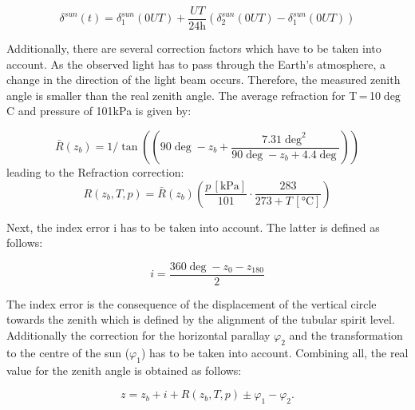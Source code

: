 \begin{equation}
    \delta^{sun}(t) = \delta^{sun}_1(0UT) + \frac{UT}{\text{24h}}(\delta^{sun}_2(0UT)-\delta^{sun}_1(0UT))
\end{equation}

Additionally, there are several correction factors which have to be taken into account. As the observed light has to pass through the Earth's atmosphere, a change in the direction of the light beam occurs. Therefore, the measured zenith angle is smaller than the real zenith angle. The average refraction for T\,=\,10$\deg$C and pressure of 101kPa is given by:

\begin{equation}
    \bar{R}(z_b) = 1/\tan((90 \deg - z_b + \frac{7.31 \deg^2}{90\deg - z_b + 4.4 \deg}))
\end{equation}
 leading to the Refraction correction: 
\begin{equation}
    R(z_b, T, p) = \bar{R}(z_b) \left( \frac{p\, [\si{\kPa}]}{101} \cdot \frac{283}{273 + T\, [\si{\celsius}]} \right)
\end{equation}

Next, the index error i has to be taken into account. The latter is defined as follows:

\begin{equation}
    i = \frac{360 \deg - z_0 - z_{180}}{2}
\end{equation}

The index error is the consequence of the displacement of the
vertical circle towards the zenith which is defined by the alignment of
the tubular spirit level. Additionally the correction for the horizontal parallay $\varphi_2$ and the transformation to the centre of the sun ($\varphi_1$) has to be taken into account. Combining all, the real value for the zenith angle is obtained as follows:

\begin{equation}
    \boxed{
        z = z_b + i + R(z_b, T, p) \pm \varphi_1
- \varphi_2    }. \label{eq:zenith_angle_corrections}
\end{equation}